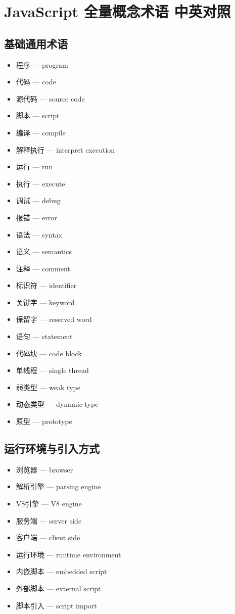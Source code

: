 
\section{JavaScript 全量概念术语 中英对照}

\subsection{基础通用术语}
\begin{itemize}
\item 程序 — program
\item 代码 — code
\item 源代码 — source code
\item 脚本 — script
\item 编译 — compile
\item 解释执行 — interpret execution
\item 运行 — run
\item 执行 — execute
\item 调试 — debug
\item 报错 — error
\item 语法 — syntax
\item 语义 — semantics
\item 注释 — comment
\item 标识符 — identifier
\item 关键字 — keyword
\item 保留字 — reserved word
\item 语句 — statement
\item 代码块 — code block
\item 单线程 — single thread
\item 弱类型 — weak type
\item 动态类型 — dynamic type
\item 原型 — prototype
\end{itemize}

\subsection{运行环境与引入方式}
\begin{itemize}
\item 浏览器 — browser
\item 解析引擎 — parsing engine
\item V8引擎 — V8 engine
\item 服务端 — server side
\item 客户端 — client side
\item 运行环境 — runtime environment
\item 内嵌脚本 — embedded script
\item 外部脚本 — external script
\item 脚本引入 — script import
\end{itemize}

